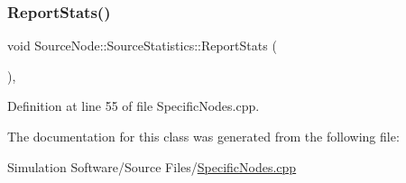 \mbox{\label{class_source_node_1_1_source_statistics_a413fa2c8297a18c1dfb509312ee19b3d}} 
\subsubsection{\texorpdfstring{Report\+Stats()}{ReportStats()}}
{\footnotesize\ttfamily void Source\+Node\+::\+Source\+Statistics\+::\+Report\+Stats (\begin{DoxyParamCaption}{ }\end{DoxyParamCaption})\hspace{0.3cm}{\ttfamily [inline]}, {\ttfamily [override]}}



Definition at line 55 of file Specific\+Nodes.\+cpp.



The documentation for this class was generated from the following file\+:\begin{DoxyCompactItemize}
\item 
Simulation Software/\+Source Files/\hyperlink{_specific_nodes_8cpp}{Specific\+Nodes.\+cpp}\end{DoxyCompactItemize}
